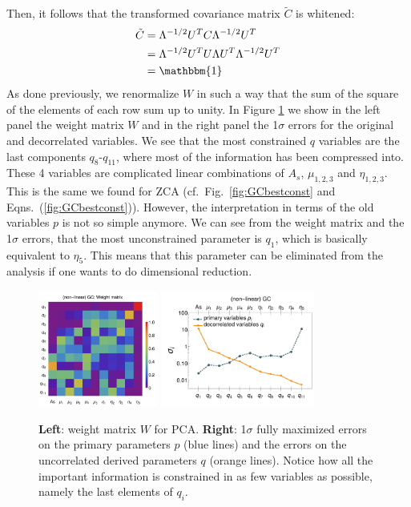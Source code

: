 Then, it follows that the transformed covariance matrix $\tilde{C}$ is whitened:
\begin{align}
\tilde{C} & =\Lambda^{-1/2}U^{T}C\Lambda^{-1/2}U^{T}\\
& =\Lambda^{-1/2}U^{T}U\Lambda U^{T}\Lambda^{-1/2}U^{T}\\
& =\mathbbm{1}
\end{align}
As done previously, we renormalize $W$ in such a way that the sum of the square of the elements of each row sum up to
unity.
In Figure \ref{fig:PCA-GCnlhs} we show in the left panel the weight matrix $W$ and in the right panel the 1$\sigma$ errors for the original
and decorrelated variables. We see that the most constrained $q$ variables are the last components $q_8$-$q_{11}$, where most
of the information has been compressed into. These 4 variables are complicated linear combinations of $A_s$, $\mu_{1,2,3}$ 
and $\eta_{1,2,3}$. This is the same we found for ZCA (cf.\ Fig.\ \ref{fig:GCbestconst} and Eqns.\ (\ref{fig:GCbestconst})). However, the interpretation
in terms of the old variables $p$ is not so simple anymore. We can see from the weight matrix and the 1$\sigma$
errors, that the most unconstrained parameter is $q_1$, which is basically equivalent to $\eta_5$. This means that this parameter can be
eliminated from the analysis if one wants to do dimensional reduction.
\begin{figure}[htbp]
	\includegraphics[width=0.35\textwidth]{Chapters/linear-nonlinear-MG-forecasts/figures/Decorrelations-GC/Weight_Matrix_PCA_SquareNorm--_fiducialMGBin3_Euclid_GC_nonlinearPk__Zhao_.pdf}
	\includegraphics[width=0.45\textwidth]{Chapters/linear-nonlinear-MG-forecasts/figures/Decorrelations-GC/Errors_at_par_index_i--_PCA_SquareNorm--fiducialMGBin3_Euclid_GC_nonlinearPk__Zhao_.pdf}
	\caption[PCA decorrelation: Weight matrix and uncorrelated errors.]{\textbf{Left}: weight matrix $W$ for PCA. \textbf{Right}: 1$\sigma$ fully maximized errors on
		the primary parameters $p$ (blue lines) and the errors on the uncorrelated
		derived parameters $q$ (orange lines). Notice how all the important information is constrained in as few variables as possible,
		namely the last elements of $q_i$.
	}\label{fig:PCA-GCnlhs}
\end{figure}


